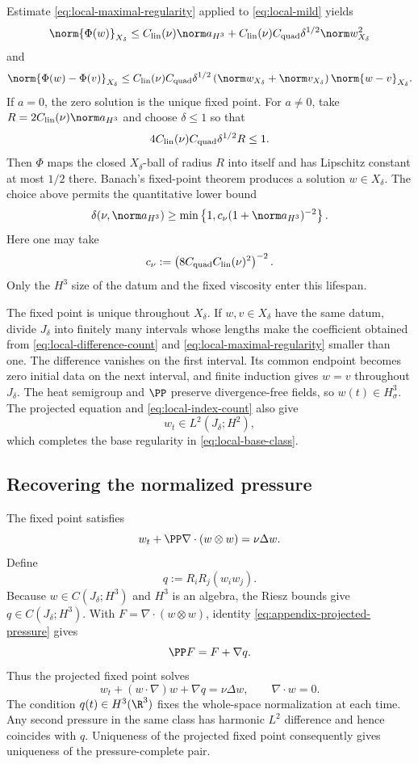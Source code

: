 Estimate \eqref{eq:local-maximal-regularity} applied to \eqref{eq:local-mild} yields
\[
 \norm{\Phi(w)}_{X_\delta}
 \le C_{\rm lin}(\nu)\norm a_{H^3}
 +C_{\rm lin}(\nu)C_{\rm quad}\delta^{1/2}
  \norm w_{X_\delta}^2
\]
and
\[
 \norm{\Phi(w)-\Phi(v)}_{X_\delta}
 \le C_{\rm lin}(\nu)C_{\rm quad}\delta^{1/2}
 \left(\norm w_{X_\delta}+\norm v_{X_\delta}\right)
 \norm{w-v}_{X_\delta}.
\]
If \(a=0\), the zero solution is the unique fixed point.
For \(a\ne0\), take
\(R=2C_{\rm lin}(\nu)\norm a_{H^3}\) and choose \(\delta\le1\) so that
\[
 4C_{\rm lin}(\nu)C_{\rm quad}\delta^{1/2}R\le1.
\]
Then \(\Phi\) maps the closed \(X_\delta\)-ball of radius \(R\) into itself and has Lipschitz constant at most \(1/2\) there.
Banach's fixed-point theorem produces a solution \(w\in X_\delta\).
The choice above permits the quantitative lower bound
\begin{equation}
 \delta(\nu,\norm a_{H^3})
 \ge\min\left\{1,c_\nu(1+\norm a_{H^3})^{-2}\right\}.
 \label{eq:local-lifespan}
\end{equation}
Here one may take
\begin{equation}
 c_\nu
 :=\left(
 8C_{\rm quad}C_{\rm lin}(\nu)^2
 \right)^{-2}.
 \label{eq:explicit-local-lifespan-constant}
\end{equation}
Only the \(H^3\) size of the datum and the fixed viscosity enter this lifespan.

The fixed point is unique throughout \(X_\delta\).
If \(w,v\in X_\delta\) have the same datum, divide \(J_\delta\) into finitely many intervals whose lengths make the coefficient obtained from \eqref{eq:local-difference-count} and \eqref{eq:local-maximal-regularity} smaller than one.
The difference vanishes on the first interval.
Its common endpoint becomes zero initial data on the next interval, and finite induction gives \(w=v\) throughout \(J_\delta\).
The heat semigroup and \(\PP\) preserve divergence-free fields, so \(w(t)\in H^3_\sigma\).
The projected equation and \eqref{eq:local-index-count} also give
\[
 w_t\in L^2(J_\delta;H^2),
\]
which completes the base regularity in \eqref{eq:local-base-class}.

\subsection{Recovering the normalized pressure}

The fixed point satisfies
\[
 w_t+\PP\nabla\cdot(w\otimes w)=\nu\Delta w.
\]
Define
\[
 q:=R_iR_j(w_iw_j).
\]
Because \(w\in C(J_\delta;H^3)\) and \(H^3\) is an algebra, the Riesz bounds give \(q\in C(J_\delta;H^3)\).
With \(F=\nabla\cdot(w\otimes w)\), identity \eqref{eq:appendix-projected-pressure} gives
\[
 \PP F=F+\nabla q.
\]
Thus the projected fixed point solves
\[
 w_t+(w\cdot\nabla)w+\nabla q=\nu\Delta w,
 \qquad
 \nabla\cdot w=0.
\]
The condition \(q(t)\in H^3(\R^3)\) fixes the whole-space normalization at each time.
Any second pressure in the same class has harmonic \(L^2\) difference and hence coincides with \(q\).
Uniqueness of the projected fixed point consequently gives uniqueness of the pressure-complete pair.

